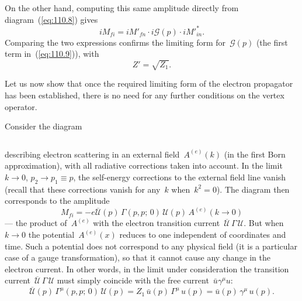 On the other hand, computing this same amplitude directly from diagram~(\ref{eq:110.8}) gives
\[
iM_{fi} = iM'_{fn} \cdot i\mathcal{G}(p) \cdot iM'^{*}_{in}.
\]
Comparing the two expressions confirms the limiting form for~$\mathcal{G}(p)$ (the first term in~(\ref{eq:110.9})), with
\begin{equation}
Z' = \sqrt{Z_1}.
\label{eq:110.15}
\end{equation}

Let us now show that once the required limiting form of the electron propagator has been established, there is no need for any further conditions on the vertex operator.

Consider the diagram

\begin{equation}
\label{eq:110.16}
\end{equation}

\noindent describing electron scattering in an external field~$A^{(e)}(k)$ (in the first Born approximation), with all radiative corrections taken into account. In the limit~$k \to 0$, $p_2 \to p_1 \equiv p$, the self-energy corrections to the external field line vanish (recall that these corrections vanish for any~$k$ when~$k^2 = 0$). The diagram then corresponds to the amplitude
\begin{equation}
M_{fi} = -e\overline{\mathcal{U}}(p)\,\Gamma(p,p;\,0)\,\mathcal{U}(p)\,A^{(e)}(k \to 0)
\label{eq:110.17}
\end{equation}
--- the product of~$A^{(e)}$ with the electron transition current~$\overline{\mathcal{U}}\,\Gamma\,\mathcal{U}$. But when~$k \to 0$ the potential~$A^{(e)}(x)$ reduces to one independent of coordinates and time. Such a potential does not correspond to any physical field (it is a particular case of a gauge transformation), so that it cannot cause any change in the electron current. In other words, in the limit under consideration the transition current~$\overline{\mathcal{U}}\,\Gamma\,\mathcal{U}$ must simply coincide with the free current~$\bar{u}\gamma^\mu u$:
\begin{equation}
\overline{\mathcal{U}}(p)\,\Gamma^\mu(p,p;\,0)\,\mathcal{U}(p) = Z_1\,\bar{u}(p)\,\Gamma^\mu\,u(p) = \bar{u}(p)\,\gamma^\mu\,u(p).
\label{eq:110.18}
\end{equation}


